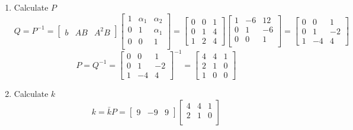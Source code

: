 \begin{enumerate}
  \item Calculate $P$
    \begin{equation}
      Q = P^{-1} =
      \begin{bmatrix}
        b & AB & A^2B
      \end{bmatrix}
      \begin{bmatrix}
        1 & \alpha_1 & \alpha_2 \\
        0 & 1 & \alpha_1 \\
        0 & 0 & 1 \\
      \end{bmatrix} = 
      \begin{bmatrix}
        0 & 0 & 1 \\
        0 & 1 & 4 \\
        1 & 2 & 4 
      \end{bmatrix}
      \begin{bmatrix}
        1 & -6 & 12 \\
        0 & 1 & -6 \\
        0 & 0 & 1 \\
      \end{bmatrix} =
      \begin{bmatrix}
        0 & 0 & 1 \\
        0 & 1 & -2 \\
        1 & -4 & 4 
      \end{bmatrix}
    \end{equation}
    \begin{equation}
      P = Q^{-1} = 
      \begin{bmatrix}
        0 & 0 & 1 \\
        0 & 1 & -2 \\
        1 & -4 & 4 
      \end{bmatrix}^{-1} =
      \begin{bmatrix}
        4 & 4 & 1\\
        2 & 1 & 0 \\
        1 & 0 & 0 
      \end{bmatrix}
    \end{equation}
  \item Calculate $k$
    \begin{equation}
      k = \bar k P =
      \begin{bmatrix}
        9 & -9 & 9
      \end{bmatrix}
      \begin{bmatrix}
        4 & 4 & 1\\
        2 & 1 & 0 \\

\end{bmatrix}
\end{equation}
\end{enumerate}
